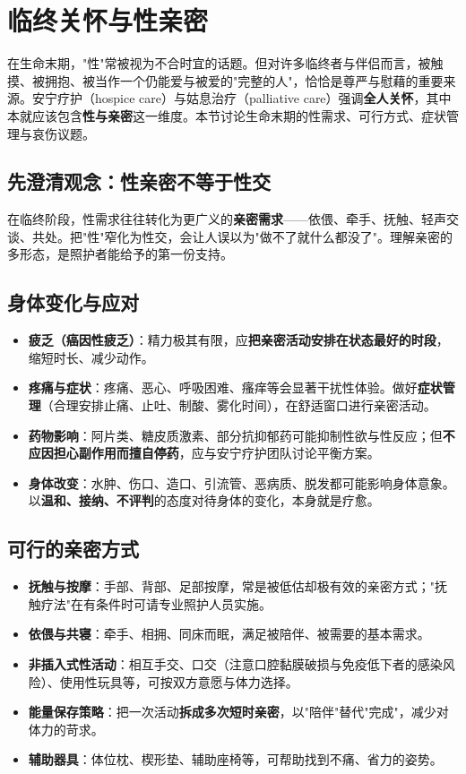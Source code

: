 \section{临终关怀与性亲密}

在生命末期，"性"常被视为不合时宜的话题。但对许多临终者与伴侣而言，被触摸、被拥抱、被当作一个仍能爱与被爱的"完整的人"，恰恰是尊严与慰藉的重要来源。安宁疗护（hospice care）与姑息治疗（palliative care）强调\textbf{全人关怀}，其中本就应该包含\textbf{性与亲密}这一维度。本节讨论生命末期的性需求、可行方式、症状管理与哀伤议题。

\subsection{先澄清观念：性亲密不等于性交}

在临终阶段，性需求往往转化为更广义的\textbf{亲密需求}——依偎、牵手、抚触、轻声交谈、共处。把"性"窄化为性交，会让人误以为"做不了就什么都没了"。理解亲密的多形态，是照护者能给予的第一份支持。

\subsection{身体变化与应对}

\begin{itemize}
	\item \textbf{疲乏（癌因性疲乏）}：精力极其有限，应\textbf{把亲密活动安排在状态最好的时段}，缩短时长、减少动作。
	\item \textbf{疼痛与症状}：疼痛、恶心、呼吸困难、瘙痒等会显著干扰性体验。做好\textbf{症状管理}（合理安排止痛、止吐、制酸、雾化时间），在舒适窗口进行亲密活动。
	\item \textbf{药物影响}：阿片类、糖皮质激素、部分抗抑郁药可能抑制性欲与性反应；但\textbf{不应因担心副作用而擅自停药}，应与安宁疗护团队讨论平衡方案。
	\item \textbf{身体改变}：水肿、伤口、造口、引流管、恶病质、脱发都可能影响身体意象。以\textbf{温和、接纳、不评判}的态度对待身体的变化，本身就是疗愈。
\end{itemize}

\subsection{可行的亲密方式}

\begin{itemize}
	\item \textbf{抚触与按摩}：手部、背部、足部按摩，常是被低估却极有效的亲密方式；"抚触疗法"在有条件时可请专业照护人员实施。
	\item \textbf{依偎与共寝}：牵手、相拥、同床而眠，满足被陪伴、被需要的基本需求。
	\item \textbf{非插入式性活动}：相互手交、口交（注意口腔黏膜破损与免疫低下者的感染风险）、使用性玩具等，可按双方意愿与体力选择。
	\item \textbf{能量保存策略}：把一次活动\textbf{拆成多次短时亲密}，以"陪伴"替代"完成"，减少对体力的苛求。
	\item \textbf{辅助器具}：体位枕、楔形垫、辅助座椅等，可帮助找到不痛、省力的姿势。
\end{itemize}

